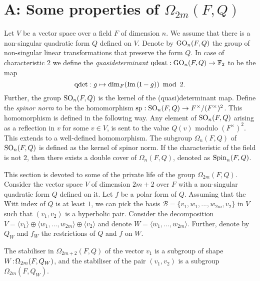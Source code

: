 \chapter{A: Some properties of $\Omega_{2m}(F,Q)$}
\label{AppA}

Let $V$ be a vector space over a field $F$ of dimension $n$. We assume that there is a 
non-singular quadratic form $Q$ defined on $V$. Denote by $\mathrm{GO}_n(F,Q)$ the group of 
non-singular linear transformations that preserve the
form $Q$. In case of characteristic $2$ we define the \textit{quasideterminant}
$\mathrm{qdeat}:\mathrm{GO}_n(F,Q) \rightarrow \mathbb{F}_2$ to be the map
\begin{equation}
    \operatorname{qdet}: g \mapsto \dim_F ( \mathrm{Im}\,(\mathord{\mathrm{I}} - g) )\ \operatorname{mod}\ 2.
\end{equation}
Further, the group $\mathrm{SO}_n(F,Q)$ is the kernel of the (quasi)determinant map. Define the 
\textit{spinor norm} to be the homomorphism $\mathrm{sp} : \mathrm{SO}_n(F,Q) \rightarrow F^{\times} / 
(F^{\times})^2$. This homomorphism is defined in the following way. Any element of 
$\mathrm{SO}_n(F,Q)$ arising as a reflection in $v$ for some $v \in V$, is sent to the value
$Q(v)$ modulo $(F^{\times})^2$. This extends to a well-defined homomorphism. The subgroup
$\Omega_n(F, Q)$ of $\mathrm{SO}_n(F,Q)$ is defined as the kernel of spinor norm. If the characteristic 
of the field is not $2$, then there exists a double cover of $\Omega_n(F,Q)$, denoted as
$\mathrm{Spin}_n(F,Q)$. 

This section is devoted to some of the private life of the group $\Omega_{2m}(F,Q)$.
Consider the vector space $V$ of dimension
$2m+2$ over $F$ with a non-singular quadratic form $Q$ defined on it. 
Let $f$ be a polar form of $Q$. 
Assuming that the Witt index of $Q$ is at least $1$, we can pick 
the basis $\mathcal{B} = \{v_1, w_1,...,w_{2m}, v_2\}$ in $V$ such that $(v_1,v_2)$ 
is a hyperbolic pair. Consider the decomposition $V = \langle v_1 \rangle \oplus
\langle w_1, ..., w_{2m} \rangle \oplus \langle v_2 \rangle$ and denote 
$W = \langle w_1, ..., w_{2m} \rangle$. Further, denote by $Q_W$ and $f_W$ the restrictions of 
$Q$ and $f$ on $W$.

\begin{lemma}
    \label{lemma:A_stabiliser_omega}
	The stabiliser in $\Omega_{2m+2}(F,Q)$ of the vector $v_1$ 
	is a subgroup of shape $W\mathord{{\;\!{:}\;\!}}\Omega_{2m}(F,Q_W)$, and the stabiliser of 
	the pair $(v_1,v_2)$ is a subgroup $\Omega_{2m}(F,Q_W)$.  
\end{lemma}

